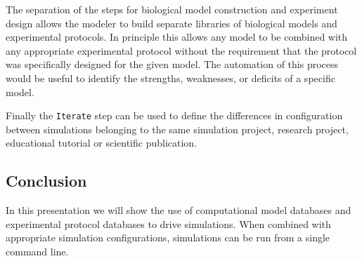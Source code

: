 \documentclass[12pt]{article}
\begin{document}
The separation of the steps for biological model construction and
experiment design allows the modeler to build separate libraries of
biological models and experimental protocols.  In principle this
allows any model to be combined with any appropriate experimental
protocol without the requirement that the protocol was specifically
designed for the given model.  The automation of this process would be
useful to identify the strengths, weaknesses, or deficits of a
specific model.

Finally the {\tt Iterate} step can be used to define the differences
in configuration between simulations belonging to the same simulation
project, research project, educational tutorial or scientific
publication.

\subsection*{Conclusion}

In this presentation we will show the use of computational model
databases and experimental protocol databases to drive simulations.
When combined with appropriate simulation configurations, simulations
can be run from a single command line.
\end{document}
